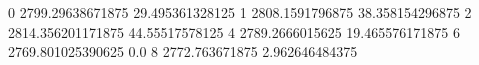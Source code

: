 0 2799.29638671875 29.495361328125
1 2808.1591796875 38.358154296875
2 2814.356201171875 44.55517578125
4 2789.2666015625 19.465576171875
6 2769.801025390625 0.0
8 2772.763671875 2.962646484375
